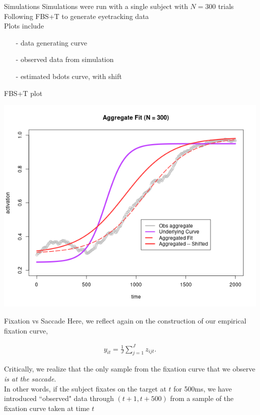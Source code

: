 \documentclass{beamer}
\begin{document}
\begin{frame}{Simulations}
Simulations were run with a single subject with $N = 300$ trials \newline \\

Following FBS+T to generate eyetracking data \newline \\

Plots include
\begin{enumerate}
  \item[-] data generating curve
  \item[-] observed data from simulation
  \item[-] estimated bdots curve, with shift
\end{enumerate}

\end{frame}

\begin{frame}{FBS+T plot}
\begin{center}
\includegraphics[scale=0.45]{img/aggregate_fit_only.png}
\end{center}
\end{frame}

\begin{frame}{Fixation vs Saccade}
Here, we reflect again on the construction of our empirical fixation curve, 

\begin{align*}
y_{it} = \frac1J \sum_{j=1}^J z_{ijt}.
\end{align*}

Critically, we realize that the only sample from the fixation curve that we observe \textit{is at the saccade}. \newline \\

In other words, if the subject fixates on the target at $t$ for 500ms, we have introduced ``observed" data through $(t+1, t + 500)$ from a sample of the fixation curve taken at time $t$
\end{frame}
\end{document}
